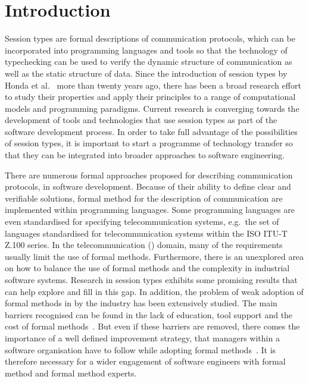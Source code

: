 
\section{Introduction}

Session types are formal descriptions of communication protocols,
which can be incorporated into programming languages and tools so
that the technology of typechecking can be used to verify the dynamic
structure of communication as well as the static structure of data.
Since the introduction of session types by Honda et al.\
\cite{honda.vasconcelos.kubo:language-primitives}
more than twenty years ago, there has been a broad research effort to study
their properties and apply their principles to a range of computational models
and programming paradigms.
Current research is converging towards the development of tools and technologies
that use session types as part of the software development process.
In order to take full advantage of the possibilities of session types,
it is important to start a programme of technology transfer so that they can
be integrated into broader approaches to software engineering.

There are numerous formal approaches proposed for describing communication protocols,
in software development.
Because of their ability to define clear and verifiable solutions, formal
method for the description of communication are implemented within programming languages.
Some programming languages are even standardised for specifying telecommunication systems,
e.g.~the set of languages standardised for telecommunication systems within the
ISO ITU-T Z.100 series.
In the telecommunication () domain, many of the requirements
usually limit the use of formal methods.
Furthermore, there is an unexplored area on how to balance the use of formal methods
and the complexity in industrial software systems.
Research in session types exhibits some promising results that can
help explore and fill in this gap.
In addition, the problem of weak adoption of formal methods
in by the industry has been extensively studied.
The main barriers recognised can be found in the lack
of education, tool support and the cost of formal methods~\cite{Davis2013}.
But even if these barriers are removed, there comes the importance of a 
well defined improvement strategy, that managers within a software
organisation have to follow while adopting formal methods~\cite{Ponsard2013}.
It is therefore necessary for a wider engagement of software engineers 
with formal method and formal method experts.


